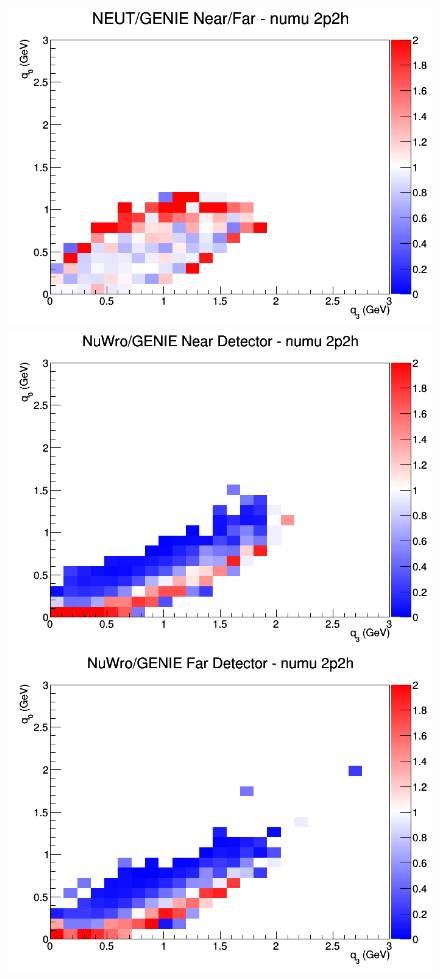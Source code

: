 \documentclass[12pt]{article}
\begin{document}
\begin{figure}[h]
\endminipage
{}
\includegraphics[width=\linewidth]{eff_q0_q3/GAr/ratios/2p2h_NEUT_GENIE_numu_NF_q3_q0.png}
\endminipage
\newline
{}
\includegraphics[width=\linewidth]{eff_q0_q3/GAr/ratios/2p2h_NuWro_GENIE_numu_near_q3_q0.png}
\endminipage
{}
\includegraphics[width=\linewidth]{eff_q0_q3/GAr/ratios/2p2h_NuWro_GENIE_numu_far_q3_q0.png}

\end{figure}
\end{document}
